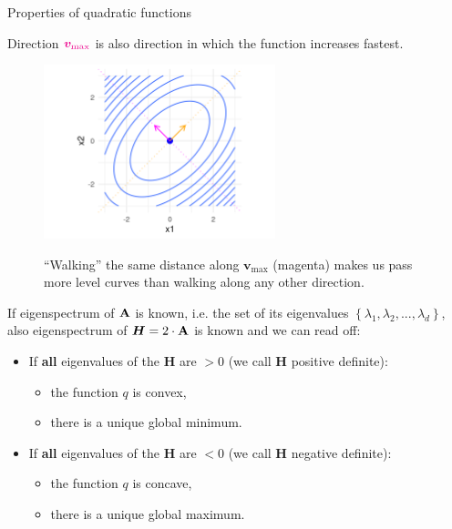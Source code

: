   
  \begin{vbframe}{Properties of quadratic functions}
  
  Direction $\textcolor{magenta}{\bm{v}_\text{max}}$ is also direction in which the function increases fastest. 
  
  \begin{figure}
    \includegraphics[width=0.6\textwidth]{figure_man/quadratic_functions_2D_example_1_7.png} \\
    \begin{footnotesize}
    \enquote{Walking} the same distance along $\bm{v}_\text{max}$ (magenta) makes us pass more level curves than walking along any other direction.
    \end{footnotesize} 
  \end{figure}
  
  
  \framebreak 
  
  If eigenspectrum of $\mathbf{A}$ is known, i.e. the set of its eigenvalues $\left\{\lambda_1, \lambda_2, ..., \lambda_d\right\}$, also eigenspectrum of $\bm{H} = 2\cdot \mathbf{A}$ is known and we can read off:
  
  \begin{itemize}
    \item If \textbf{all} eigenvalues of the $\bm{H}$ are $>0$ (we call $\bm{H}$ positive definite): 
    \begin{itemize} 
      \item the function $q$ is convex,
      \item there is a unique global minimum. 
    \end{itemize}
    \item If \textbf{all} eigenvalues of the $\bm{H}$ are $<0$ (we call $\bm{H}$ negative definite): 
    \begin{itemize} 
      \item the function $q$ is concave,
      \item there is a unique global maximum. 
    \end{itemize}
  

\end{itemize}
\end{vbframe}
